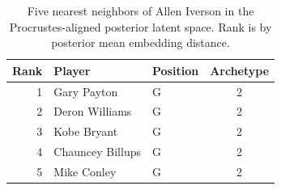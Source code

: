 \begin{table}[htbp]
  \centering\small
  \begin{tabular}{rllc}
    \toprule
    Rank & Player & Position & Archetype \\
    \midrule
    1 & Gary Payton & G & 2 \\
    2 & Deron Williams & G & 2 \\
    3 & Kobe Bryant & G & 2 \\
    4 & Chauncey Billups & G & 2 \\
    5 & Mike Conley & G & 2 \\
    \bottomrule
  \end{tabular}
  \caption{Five nearest neighbors of Allen Iverson in the Procrustes-aligned posterior latent space. Rank is by posterior mean embedding distance.}
\end{table}

